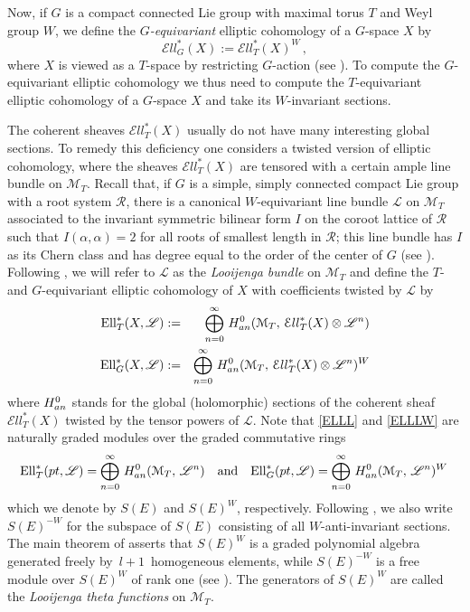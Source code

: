 \documentclass[11pt]{amsart}
\theoremstyle{definition}
\theoremstyle{remark}
\numberwithin{equation}{section}
\newcommand{\la}{\label}
\def\M{\mathcal{M}}
\def\cL{\mathscr{
L}}
\def\R{\mathcal{R}}
\def\Ell{\mathcal{E}{ll}}
\def\ELL{\mathrm{Ell}}
\begin{document}
Now, if $G$ is a compact connected Lie group with maximal torus $T$ and Weyl
group $W$, we define the {\it $G$-equivariant} elliptic cohomology of a $G$-space $X$ by
%
\begin{equation}
\la{TWG}
 \Ell_G^*(X) := \Ell_T^*(X)^W \,,  
\end{equation}
%
where $X$ is viewed as a $T$-space by restricting $G$-action (see \cite[3.4]{Ga14}). To compute the $G$-equivariant elliptic cohomology we thus need to compute the $T$-equivariant elliptic cohomology of a $G$-space $X$ and take its $W$-invariant sections.

The coherent sheaves $\Ell_T^*(X) $ usually do not have many interesting global sections. To remedy this deficiency one considers a twisted version of elliptic cohomology, where the sheaves $\Ell_T^*(X)$ are tensored with
a certain ample line bundle on $\M_T$. Recall that, if $G$ is a simple, simply connected compact Lie group
with a root system $\R$, there is a canonical $W$-equivariant line bundle $ {\mathscr L} $ on $ \M_T $ associated to the invariant symmetric bilinear form $I$ on the coroot lattice of $\R$ such that $ I(\alpha, \alpha) = 2 $
for all roots of smallest length in $\R$; this line bundle has $I$ as its Chern class and 
has degree equal to the order of the center of $G$  (see \cite{Lo77}). Following \cite{An00, Ga14}, we will refer to $\cL$ as the {\it Looijenga bundle} on $\M_T$ and define the $T$- and $G$-equivariant elliptic cohomology of $X$ with coefficients twisted by $ {\mathscr L}$ by
%
\begin{eqnarray}
\ELL_T^*(X, {\mathscr L}) &:=&
\bigoplus_{n=0}^{\infty}\, H_{\rm an}^0(\M_T,\,\Ell_T^*(X) \otimes {\mathscr L}^{n})\la{ELLL}\\
\ELL_G^*(X, {\mathscr L}) &:=&
\bigoplus_{n=0}^{\infty}\, H_{\rm an}^0(\M_T,\,\Ell_T^*(X) \otimes {\mathscr L}^{n})^W\la{ELLLW}
\end{eqnarray}
%
where $H_{\rm an}^0$ stands for the global (holomorphic) sections of the coherent sheaf $ \Ell_T^*(X) $  twisted by the tensor powers of ${\mathscr L}$. Note that \eqref{ELLL} and \eqref{ELLLW} are naturally graded modules over the graded commutative rings 
%
\begin{equation}
\la{SEW}
\ELL_T^*({\rm pt}, {\mathscr L}) = \bigoplus_{n=0}^{\infty}\, H_{\rm an}^0(\M_T,\,{\mathscr L}^{n})\quad \mbox{and}\quad \ELL_G^*({\rm pt}, {\mathscr L}) = \bigoplus_{n=0}^{\infty}\, H_{\rm an}^0(\M_T,\,{\mathscr L}^{n})^W\,
\end{equation}
%
which we denote by $S(E)$ and $ S(E)^W$, respectively. Following \cite{Lo77}, we also write $ S(E)^{-W}$
for the subspace of $S(E)$ consisting of all $W$-anti-invariant sections. The main theorem of \cite{Lo77} asserts that $ S(E)^W$ is a graded polynomial algebra generated freely by $\,l+1\,$ homogeneous elements, while $ S(E)^{-W} $ is a free module over $S(E)^W$ of rank one (see \cite[(3.4)]{Lo77}).  The generators of $S(E)^W$
are called the {\it Looijenga theta functions} on $ \M_T $.
\end{document}
